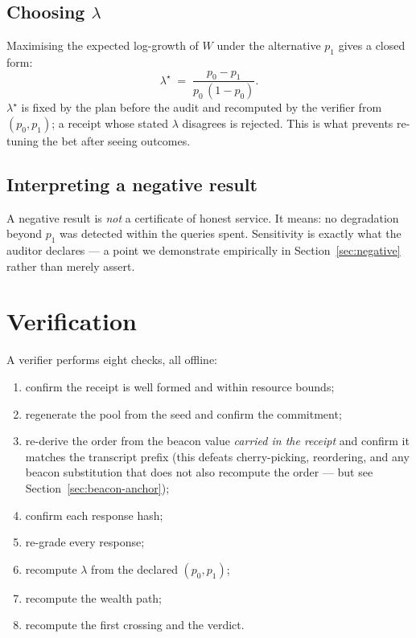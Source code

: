 \documentclass[11pt]{article}
\theoremstyle{definition}
\begin{document}
\subsection{Choosing $\lambda$}

Maximising the expected log-growth of $W$ under the alternative $p_1$ gives a
closed form:
\[
\lambda^\star \;=\; \frac{p_0 - p_1}{p_0\,(1 - p_0)} .
\]
$\lambda^\star$ is fixed by the plan before the audit and recomputed by the
verifier from $(p_0, p_1)$; a receipt whose stated $\lambda$ disagrees is
rejected. This is what prevents re-tuning the bet after seeing outcomes.

\subsection{Interpreting a negative result}

A negative result is \emph{not} a certificate of honest service. It means: no
degradation beyond $p_1$ was detected within the queries spent. Sensitivity is
exactly what the auditor declares --- a point we demonstrate empirically in
Section~\ref{sec:negative} rather than merely assert.

\section{Verification}

A verifier performs eight checks, all offline:

\begin{enumerate}\itemsep2pt
\item confirm the receipt is well formed and within resource bounds;
\item regenerate the pool from the seed and confirm the commitment;
\item re-derive the order from the beacon value \emph{carried in the receipt}
and confirm it matches the transcript prefix (this defeats cherry-picking,
reordering, and any beacon substitution that does not also recompute the order
--- but see Section~\ref{sec:beacon-anchor});
\item confirm each response hash;
\item re-grade every response;
\item recompute $\lambda$ from the declared $(p_0,p_1)$;
\item recompute the wealth path;
\item recompute the first crossing and the verdict.
\end{enumerate}
\end{document}
